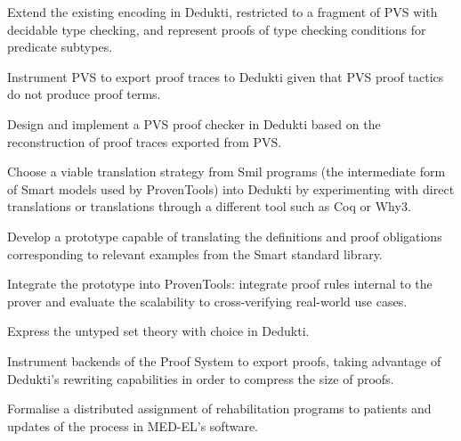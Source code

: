 \begin{workpackage}
\begin{tasklist}
\begin{task}[id=pvs,
  title=Express the theory of PVS in Dedukti,
  shorttitle=PVS,
  lead=Inr,   %
  InrRM=20,  %
  wphases=1-48,
  ]
  \vspace{-5mm}
  \begin{compactitem}
  \item Extend the existing encoding in Dedukti,
    restricted to a fragment of PVS with decidable type checking, and represent
    proofs of type checking conditions for predicate subtypes.
  \item Instrument PVS to export proof traces to Dedukti given that PVS proof
    tactics do not produce proof terms.
  \item Design and implement a PVS proof checker in Dedukti based on the
    reconstruction of proof traces exported from PVS.
  \end{compactitem}
\end{task}

\begin{task}[id=smart,
  title=Express Smart models and proofs in Dedukti,
  shorttitle=Smart,
  lead=Pro,   %
  ProRM=11,
  wphases=1-48,
  ]
  \vspace{-5mm}
  \begin{compactitem}
  \item Choose a viable translation strategy from Smil programs (the
    intermediate form of Smart models used by ProvenTools) into Dedukti
    by experimenting with direct translations or translations through a
    different tool such as Coq or Why3.
  \item Develop a prototype capable of translating the definitions and proof
    obligations corresponding to relevant examples from the Smart
    standard library.
  \item Integrate the prototype into ProvenTools: integrate proof rules internal
    to the prover and evaluate the scalability to cross-verifying real-world use
    cases.
  \end{compactitem}
\end{task}

\begin{task}[id=tla,
  title=Express the theory of \tlaplus in Dedukti,
  shorttitle=\tlaplus,
  lead=Inr,   %
  InrRM=21,   %
  MedRM=4,
  wphases=1-48,
  ]
  \vspace{-5mm}
  \begin{compactitem}
  \item Express the untyped \tlaplus set theory with choice in
    Dedukti.
  \item Instrument backends of the \tlaplus Proof System to export proofs,
    taking advantage of Dedukti's rewriting capabilities in order to compress
    the size of proofs.
  \item Formalise a distributed assignment of rehabilitation programs to
    patients and updates of the process in MED-EL's software.
  \end{compactitem}
\end{task}


\end{tasklist}
\end{workpackage}
